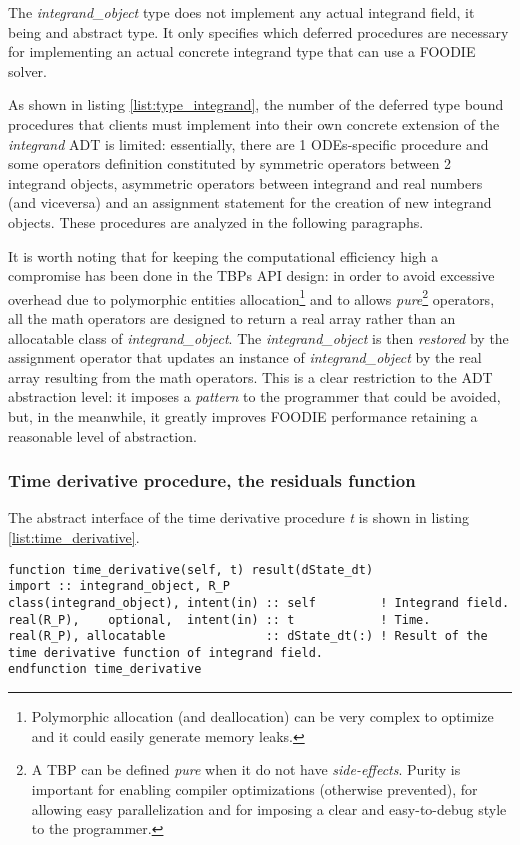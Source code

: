 The \emph{integrand\_object} type does not implement any actual integrand field, it being and abstract type. It only specifies which deferred procedures are necessary for implementing an actual concrete integrand type that can use a FOODIE solver.

As shown in listing \ref{list:type_integrand}, the number of the deferred type bound procedures that clients must implement into their own concrete extension of the \emph{integrand} ADT is limited: essentially, there are 1 ODEs-specific procedure and some operators definition constituted by symmetric operators between 2 integrand objects, asymmetric operators between integrand and real numbers (and viceversa) and an assignment statement for the creation of new integrand objects. These procedures are analyzed in the following paragraphs.

It is worth noting that for keeping the computational efficiency high a compromise has been done in the TBPs API design: in order to avoid excessive overhead due to polymorphic entities allocation\footnote{Polymorphic allocation (and deallocation) can be very complex to optimize and it could easily generate memory leaks.} and to allows \emph{pure}\footnote{A TBP can be defined \emph{pure} when it do not have \emph{side-effects}. Purity is important for enabling compiler optimizations (otherwise prevented), for allowing easy parallelization and for imposing a clear and easy-to-debug style to the programmer.} operators, all the math operators are designed to return a real array rather than an allocatable class of \emph{integrand\_object}. The \emph{integrand\_object} is then \emph{restored} by the assignment operator that updates an instance of \emph{integrand\_object} by the real array resulting from the math operators. This is a clear restriction to the ADT abstraction level: it imposes a \emph{pattern} to the programmer that could be avoided, but, in the meanwhile, it greatly improves FOODIE performance retaining a reasonable level of abstraction.

\subsubsection{Time derivative procedure, the residuals function}

The abstract interface of the time derivative procedure \emph{t} is shown in listing \ref{list:time_derivative}.

\begin{lstlisting}[firstnumber=1,style=code,caption={time derivative procedure interface},label={list:time_derivative}]
function time_derivative(self, t) result(dState_dt)
import :: integrand_object, R_P
class(integrand_object), intent(in) :: self         ! Integrand field.
real(R_P),    optional,  intent(in) :: t            ! Time.
real(R_P), allocatable              :: dState_dt(:) ! Result of the time derivative function of integrand field.
endfunction time_derivative
\end{lstlisting}

